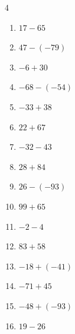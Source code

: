 \begin{multicols}{4}
\begin{enumerate}
        \phantom{$=8$}

  \item $17-65$

        \phantom{$=-48$}

  \item $47-(-79)$

        \phantom{$=126$}

\columnbreak %

  \item $-6+30$

        \phantom{$=24$}

  \item $-68-(-54)$

        \phantom{$=-14$}

  \item $-33+38$

        \phantom{$=5$}

  \item $22+67$

        \phantom{$=89$}

  \item $-32-43$

        \phantom{$=-75$}

  \item $28+84$

        \phantom{$=112$}

  \item $26-(-93)$

        \phantom{$=119$}

  \item $99+65$

        \phantom{$=164$}

  \item $-2-4$

        \phantom{$=-6$}

  \item $83+58$

        \phantom{$=141$}

  \item $-18+(-41)$

        \phantom{$=-59$}

  \item $-71+45$

        \phantom{$=-26$}

  \item $-48+(-93)$

        \phantom{$=-141$}

  \item $19-26$


\end{enumerate}
\end{multicols}

